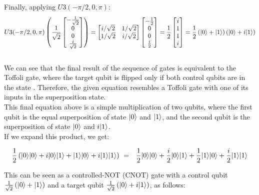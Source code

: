 \documentclass{article}
\begin{document}
	Finally, applying \( U3(-\pi/2, 0, \pi) \):
	\[       
	U3(-\pi/2, 0, \pi) 
	\left(
	\frac{1}{\sqrt{2}} 
	\begin{bmatrix} 
		-\frac{1}{\sqrt{2}} \\
		0 \\ 
		0 \\ 
		\frac{i}{\sqrt{2}} 
	\end{bmatrix}
	\right) 
	= 
	\begin{bmatrix} 
		i/\sqrt{2} 
		& 1/\sqrt{2} 
		\\ 
		1/\sqrt{2} 
		& i/\sqrt{2} 
	\end{bmatrix} 
	\begin{bmatrix} 
		-\frac{1}{2} \\
		0 \\
		0 \\ 
		\frac{i}{2} 
	\end{bmatrix} 
	= 
	\frac{1}{2} 
	\begin{bmatrix} 
		i \\ 
		1 \\ 
		1 \\
		i 
	\end{bmatrix} 
	= 
	\frac{1}{2} 
	\left(
	 |0\rangle  +  |1\rangle 
	\right) 
	\left(
	 |0\rangle  + i |1\rangle 
	\right)
	\] \\
	
	We can see that the final result of the sequence of gates is equivalent to the Toffoli gate, where the target qubit is flipped only if both control qubits are in the state .  Therefore, the given equation resembles a Toffoli gate with one of its inputs in the superposition state. \\
	
	This final equation above is a simple multiplication of two qubits, where the first qubit is the equal superposition of state $ |0\rangle $ and $ |1\rangle $, and the second qubit is the superposition of state $ |0\rangle $ and $i |1\rangle $. \\
	
	If we expand this product, we get:
	
	\begin{align*}
		&\frac{1}{2} \left( |0\rangle  |0\rangle  + i |0\rangle  |1\rangle  +  |1\rangle  |0\rangle  + i |1\rangle  |1\rangle \right) \
		=& \frac{1}{2}  |0\rangle  |0\rangle  + \frac{i}{2}  |0\rangle  |1\rangle  + \frac{1}{2}  |1\rangle  |0\rangle  + \frac{i}{2}  |1\rangle  |1\rangle 
	\end{align*}
	
	This can be seen as a controlled-NOT (CNOT) gate with a control qubit $\frac{1}{\sqrt{2}}\left( |0\rangle  +  |1\rangle \right)$ and a target qubit $\frac{1}{\sqrt{2}}\left( |0\rangle  + i |1\rangle \right)$, as follows: \\
\end{document}
